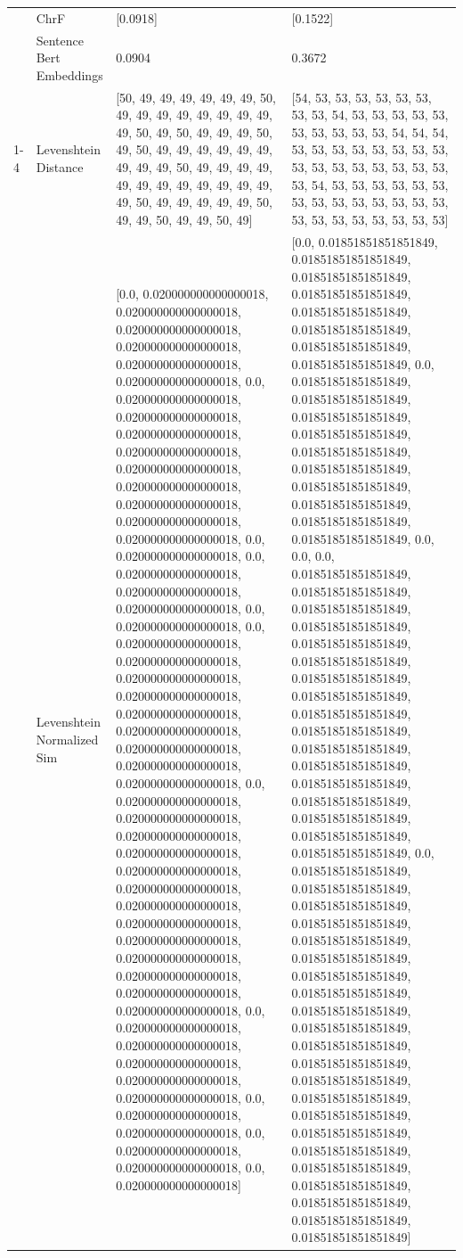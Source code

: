\begin{tabular}{llll}
 & ChrF & [0.0918] & [0.1522] \\
 & Sentence Bert Embeddings & 0.0904 & 0.3672 \\
\cline{1-4}
\multirow[t]{4}{*}{Kigina gitininukagio irio hande itari nguru} & Levenshtein Distance & [50, 49, 49, 49, 49, 49, 49, 50, 49, 49, 49, 49, 49, 49, 49, 49, 49, 50, 49, 50, 49, 49, 49, 50, 49, 50, 49, 49, 49, 49, 49, 49, 49, 49, 49, 50, 49, 49, 49, 49, 49, 49, 49, 49, 49, 49, 49, 49, 49, 50, 49, 49, 49, 49, 49, 50, 49, 49, 50, 49, 49, 50, 49] & [54, 53, 53, 53, 53, 53, 53, 53, 53, 54, 53, 53, 53, 53, 53, 53, 53, 53, 53, 53, 54, 54, 54, 53, 53, 53, 53, 53, 53, 53, 53, 53, 53, 53, 53, 53, 53, 53, 53, 53, 54, 53, 53, 53, 53, 53, 53, 53, 53, 53, 53, 53, 53, 53, 53, 53, 53, 53, 53, 53, 53, 53, 53] \\
 & Levenshtein Normalized Sim & [0.0, 0.020000000000000018, 0.020000000000000018, 0.020000000000000018, 0.020000000000000018, 0.020000000000000018, 0.020000000000000018, 0.0, 0.020000000000000018, 0.020000000000000018, 0.020000000000000018, 0.020000000000000018, 0.020000000000000018, 0.020000000000000018, 0.020000000000000018, 0.020000000000000018, 0.020000000000000018, 0.0, 0.020000000000000018, 0.0, 0.020000000000000018, 0.020000000000000018, 0.020000000000000018, 0.0, 0.020000000000000018, 0.0, 0.020000000000000018, 0.020000000000000018, 0.020000000000000018, 0.020000000000000018, 0.020000000000000018, 0.020000000000000018, 0.020000000000000018, 0.020000000000000018, 0.020000000000000018, 0.0, 0.020000000000000018, 0.020000000000000018, 0.020000000000000018, 0.020000000000000018, 0.020000000000000018, 0.020000000000000018, 0.020000000000000018, 0.020000000000000018, 0.020000000000000018, 0.020000000000000018, 0.020000000000000018, 0.020000000000000018, 0.020000000000000018, 0.0, 0.020000000000000018, 0.020000000000000018, 0.020000000000000018, 0.020000000000000018, 0.020000000000000018, 0.0, 0.020000000000000018, 0.020000000000000018, 0.0, 0.020000000000000018, 0.020000000000000018, 0.0, 0.020000000000000018] & [0.0, 0.01851851851851849, 0.01851851851851849, 0.01851851851851849, 0.01851851851851849, 0.01851851851851849, 0.01851851851851849, 0.01851851851851849, 0.01851851851851849, 0.0, 0.01851851851851849, 0.01851851851851849, 0.01851851851851849, 0.01851851851851849, 0.01851851851851849, 0.01851851851851849, 0.01851851851851849, 0.01851851851851849, 0.01851851851851849, 0.01851851851851849, 0.0, 0.0, 0.0, 0.01851851851851849, 0.01851851851851849, 0.01851851851851849, 0.01851851851851849, 0.01851851851851849, 0.01851851851851849, 0.01851851851851849, 0.01851851851851849, 0.01851851851851849, 0.01851851851851849, 0.01851851851851849, 0.01851851851851849, 0.01851851851851849, 0.01851851851851849, 0.01851851851851849, 0.01851851851851849, 0.01851851851851849, 0.0, 0.01851851851851849, 0.01851851851851849, 0.01851851851851849, 0.01851851851851849, 0.01851851851851849, 0.01851851851851849, 0.01851851851851849, 0.01851851851851849, 0.01851851851851849, 0.01851851851851849, 0.01851851851851849, 0.01851851851851849, 0.01851851851851849, 0.01851851851851849, 0.01851851851851849, 0.01851851851851849, 0.01851851851851849, 0.01851851851851849, 0.01851851851851849, 0.01851851851851849, 0.01851851851851849, 0.01851851851851849] \\

\end{tabular}
